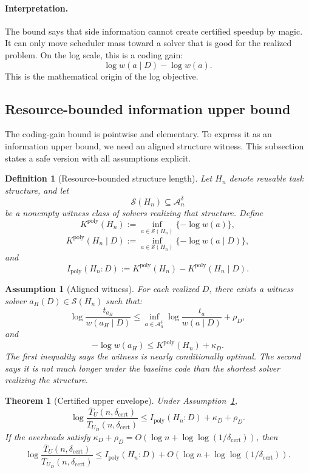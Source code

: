 \documentclass{article}
\newtheorem{assumption}{Assumption}
\newtheorem{definition}{Definition}
\newtheorem{theorem}{Theorem}
\newcommand{\cA}{\mathcal{A}}
\newcommand{\cS}{\mathcal{S}}
\begin{document}
\paragraph{Interpretation.}
The bound says that side information cannot create certified speedup by magic.
It can only move scheduler mass toward a solver that is good for the realized problem.
On the log scale, this is a coding gain:
\[
    \log w(a\mid D)-\log w(a).
\]
This is the mathematical origin of the log objective.

\subsection{Resource-bounded information upper bound}

The coding-gain bound is pointwise and elementary.
To express it as an information upper bound, we need an aligned structure witness.
This subsection states a safe version with all assumptions explicit.

\begin{definition}[Resource-bounded structure length]
\label{def:app-ipoly}
Let \(H_n\) denote reusable task structure, and let
\[
    \cS(H_n)\subseteq\cA_n^\delta
\]
be a nonempty witness class of solvers realizing that structure.
Define
\[
    K^{\mathrm{poly}}(H_n)
    :=
    \inf_{a\in\cS(H_n)}\{-\log w(a)\},
\]
\[
    K^{\mathrm{poly}}(H_n\mid D)
    :=
    \inf_{a\in\cS(H_n)}\{-\log w(a\mid D)\},
\]
and
\[
    I_{\mathrm{poly}}(H_n:D)
    :=
    K^{\mathrm{poly}}(H_n)
    -
    K^{\mathrm{poly}}(H_n\mid D).
\]
\end{definition}

\begin{assumption}[Aligned witness]
\label{ass:app-aligned-witness}
For each realized \(D\), there exists a witness solver \(a_H(D)\in\cS(H_n)\) such that:
\[
    \log\frac{t_{a_H}}{w(a_H\mid D)}
    \le
    \inf_{a\in\cA_n^\delta}
    \log\frac{t_a}{w(a\mid D)}
    +
    \rho_D ,
\]
and
\[
    -\log w(a_H)
    \le
    K^{\mathrm{poly}}(H_n)+\kappa_D .
\]
The first inequality says the witness is nearly conditionally optimal.
The second says it is not much longer under the baseline code than the shortest solver
realizing the structure.
\end{assumption}

\begin{theorem}[Certified upper envelope]
\label{thm:app-certified-upper-envelope}
Under Assumption~\ref{ass:app-aligned-witness},
\[
    \log\frac{\overline T_U(n,\delta_{\mathrm{cert}})}
             {\overline T_{U_D}(n,\delta_{\mathrm{cert}})}
    \le
    I_{\mathrm{poly}}(H_n:D)+\kappa_D+\rho_D .
\]
If the overheads satisfy \(\kappa_D+\rho_D=O(\log n+\log\log(1/\delta_{\mathrm{cert}}))\),
then
\[
    \log\frac{\overline T_U(n,\delta_{\mathrm{cert}})}
             {\overline T_{U_D}(n,\delta_{\mathrm{cert}})}
    \le
    I_{\mathrm{poly}}(H_n:D)
    +
    O(\log n+\log\log(1/\delta_{\mathrm{cert}})).
\]
\end{theorem}
\end{document}
